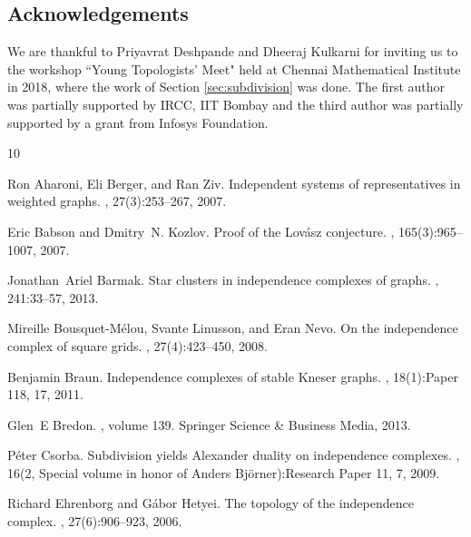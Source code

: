 \documentclass[12pt]{article}
\numberwithin{thm}{section}
\theoremstyle{definition}
\begin{document}
  \subsection*{Acknowledgements}
  We are thankful to Priyavrat Deshpande and Dheeraj Kulkarni for inviting us to the workshop ``Young Topologists' Meet" held at Chennai Mathematical Institute in 2018, where the work of Section \ref{sec:subdivision} was done. The first author was partially supported by IRCC, IIT Bombay and the third author was partially supported by a grant from Infosys Foundation.
  
 
  
   
%  
%  
\begin{thebibliography}{10}
	
	Ron Aharoni, Eli Berger, and Ran Ziv.
	\newblock Independent systems of representatives in weighted graphs.
	, 27(3):253--267, 2007.
	
	Eric Babson and Dmitry~N. Kozlov.
	\newblock Proof of the {L}ov\'{a}sz conjecture.
	, 165(3):965--1007, 2007.
	
	Jonathan~Ariel Barmak.
	\newblock Star clusters in independence complexes of graphs.
	, 241:33--57, 2013.
	
	Mireille Bousquet-M\'{e}lou, Svante Linusson, and Eran Nevo.
	\newblock On the independence complex of square grids.
	, 27(4):423--450, 2008.
	
	Benjamin Braun.
	\newblock Independence complexes of stable {K}neser graphs.
	, 18(1):Paper 118, 17, 2011.
	
	Glen~E Bredon.
	, volume 139.
	\newblock Springer Science \& Business Media, 2013.
	
	P\'{e}ter Csorba.
	\newblock Subdivision yields {A}lexander duality on independence complexes.
	, 16(2, Special volume in honor of Anders
	Bj\"{o}rner):Research Paper 11, 7, 2009.
	
	Richard Ehrenborg and G\'{a}bor Hetyei.
	\newblock The topology of the independence complex.
	, 27(6):906--923, 2006.
	

\end{thebibliography}
\end{document}
